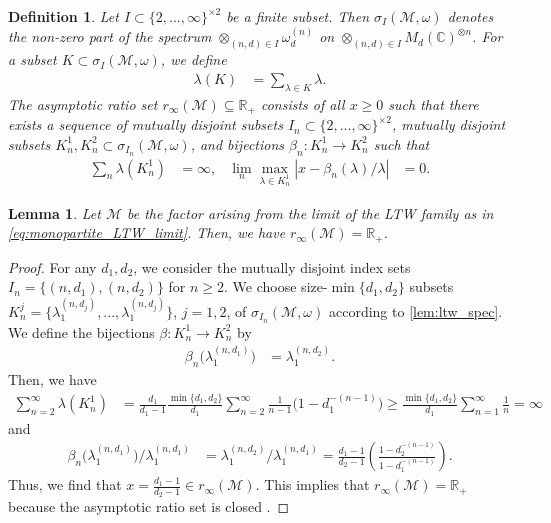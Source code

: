 \documentclass[a4paper, 10pt, onecolumn, accepted=2025-07-22]{quantumarticle}
\newtheorem{lemma}[theorem]{Lemma}
\newtheorem{definition}[theorem]{Definition}
\theoremstyle{definition}
\newcommand{\ox}{\otimes}
\newcommand{\mc}{\mathcal}
\def\M{{\mc M}}
\def\RR{{\mathbb R}}
\newcommand*{\1}{\text{\usefont{U}{bbold}{m}{n}1}}
\begin{document}
\begin{definition}{\cite[Def.~3.2]{araki1968factors}}
\label{def:asymptotic_ratio}
Let $I\subset\{2,...,\infty\}^{\times 2}$ be a finite subset. Then $\sigma_{I}(\M,\omega)$ denotes the non-zero part of the spectrum $\ox_{(n,d)\in I}\omega^{(n)}_{d}$ on $\ox_{(n,d)\in I}M_{d}(\mathbb C)^{\ox n}$. For a subset $K\subset\sigma_{I}(\M,\omega)$, we define
\begin{align}
\label{eq:spec_subsum}
\lambda(K) & = \sum_{\lambda\in K}\lambda.
\end{align}
The asymptotic ratio set $r_{\infty}(\M)\subseteq\RR_{+}$ consists of all $x\geq0$ such that there exists a sequence of mutually disjoint subsets $I_{n}\subset\{2,...,\infty\}^{\times 2}$, mutually disjoint subsets $K^{1}_{n},K^{2}_{n}\subset\sigma_{I_{n}}(\M,\omega)$, and bijections $\beta_{n}:K^{1}_{n}\to K^{2}_{n}$ such that
\begin{align}
\label{eq:spec_subsum_infty}
\sum_{n}\lambda(K^{1}_{n}) & = \infty, & \lim_{n}\max_{\lambda\in K^{1}_{n}}|x-\beta_{n}(\lambda)/\lambda| & = 0.
\end{align}
\end{definition}
\begin{lemma}
\label{lem:ltw_ratios}
Let $\M$ be the factor arising from the limit of the LTW family as in \eqref{eq:monopartite_LTW_limit}.
Then, we have $r_{\infty}(\M) = \RR_{+}$.
\end{lemma}
\begin{proof}
For any $d_{1},d_{2}$, we consider the mutually disjoint index sets $I_{n}=\{(n,d_{1}),(n,d_{2})\}$ for $n\geq2$. We choose size-$\min\{d_{1},d_{2}\}$ subsets $K^{j}_{n}=\{\lambda^{(n,d_{j})}_{1},...,\lambda^{(n,d_{j})}_{1}\}$, $j=1,2$, of $\sigma_{I_{n}}(\M,\omega)$ according to \cref{lem:ltw_spec}. We define the bijections $\beta:K^{1}_{n}\to K^{2}_{n}$ by
\begin{align}
\label{eq:ltw_bij}
\beta_{n}\Big(\lambda^{(n,d_{1})}_{1}\Big) & = \lambda^{(n,d_{2})}_{1}.
\end{align}
Then, we have
\begin{align}
\label{eq:ltw_subsum}
\sum_{n=2}^{\infty}\lambda(K^{1}_{n}) & = \frac{d_{1}}{d_{1}-1}\frac{\min\{d_{1},d_{2}\}}{d_{1}}\sum_{n=2}^{\infty}\frac{1}{n-1}\Big(1-d_{1}^{-(n-1)}\Big) \geq \frac{\min\{d_{1},d_{2}\}}{d_{1}}\sum_{n=1}^{\infty}\frac{1}{n} = \infty
\end{align}
and
\begin{align}
\label{eq:ltw_ratios}
\beta_{n}\Big(\lambda^{(n,d_{1})}_{1}\Big)/\lambda^{(n,d_{1})}_{1} & = \lambda^{(n,d_{2})}_{1}/\lambda^{(n,d_{1})}_{1} = \frac{d_{1}-1}{d_{2}-1}\left(\frac{1-d_{2}^{-(n-1)}}{1-d_{1}^{-(n-1)}}\right).
\end{align}
Thus, we find that $x = \tfrac{d_{1}-1}{d_{2}-1}\in r_{\infty}(\M)$. This implies that $r_{\infty}(\M)=\RR_{+}$ because the asymptotic ratio set is closed \cite{araki1968factors}.
\end{proof}
\end{document}
